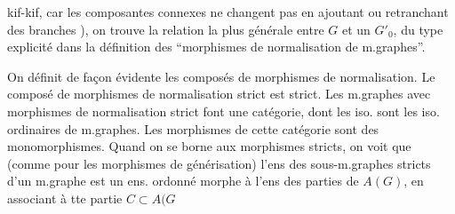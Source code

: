 kif-kif, car les composantes connexes ne changent pas en ajoutant ou retranchant des branches ), on trouve la relation la plus générale entre $G$ et un $G'_0$, du type explicité dans la définition des ``morphismes de normalisation de m.graphes''.

On définit de façon évidente les composés de morphismes de normalisation. Le composé de morphismes de normalisation strict est strict. Les m.graphes avec morphismes de normalisation strict font une catégorie, dont les iso. sont les iso. ordinaires de m.graphes. Les morphismes de cette catégorie sont des monomorphismes. Quand on se borne aux morphismes  stricts, on voit que (comme pour les morphismes de générisation) l'ens des sous-m.graphes stricts d'un m.graphe  est un ens. ordonné morphe à l'ens des parties de $A(G)$, en associant à tte partie $C\subset A(G$
